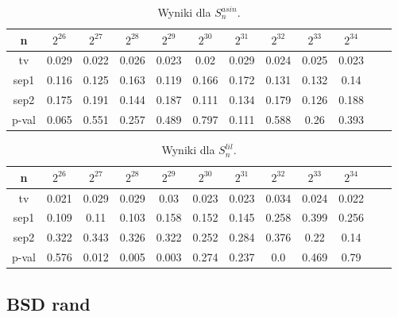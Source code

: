 \documentclass[a4paper,11pt,twoside]{book}
\newcommand{\Slil}[1]{S^{lil}_#1}
\newcommand{\Sasin}[1]{S^{asin}_#1}
\theoremstyle{definition}
\begin{document}
\begin{table}[ht!]
\centering
 \caption{Wyniki dla $\Sasin{n}$.}
 \label{tab:mojkomp_asin}
\begin{tabular} {||c|c|c|c|c|c|c|c|c|c|c|c||}  
 \hline
     n &  $2^{26}$ &  $2^{27}$ &  $2^{28}$ &  $2^{29}$ &  $2^{30}$ &  $2^{31}$ &  $2^{32}$ &  $2^{33}$ &  $2^{34}$\\ \hline
    tv &  0.029 &  0.022 &  0.026 &  0.023 &   0.02 &  0.029 &  0.024 &  0.025 &  0.023\\ \hline
  sep1 &  0.116 &  0.125 &  0.163 &  0.119 &  0.166 &  0.172 &  0.131 &  0.132 &   0.14\\ \hline
  sep2 &  0.175 &  0.191 &  0.144 &  0.187 &  0.111 &  0.134 &  0.179 &  0.126 &  0.188\\ \hline
 p-val &  0.065 &  0.551 &  0.257 &  0.489 &  0.797 &  0.111 &  0.588 &   0.26 &  0.393\\ \hline


 
\end{tabular}  
\end{table}
\begin{table}[ht!]
\centering
 \caption{Wyniki dla $\Slil{n}$.}
 \label{tab:mojkomp_lil}
\begin{tabular} {||c|c|c|c|c|c|c|c|c|c|c|c||}  
 \hline 
     n &  $2^{26}$ &  $2^{27}$ &  $2^{28}$ &  $2^{29}$ &  $2^{30}$ &  $2^{31}$ &  $2^{32}$ &  $2^{33}$ &  $2^{34}$\\ \hline
    tv &  0.021 &  0.029 &  0.029 &   0.03 &  0.023 &  0.023 &  0.034 &  0.024 &  0.022\\ \hline
  sep1 &  0.109 &   0.11 &  0.103 &  0.158 &  0.152 &  0.145 &  0.258 &  0.399 &  0.256\\ \hline
  sep2 &  0.322 &  0.343 &  0.326 &  0.322 &  0.252 &  0.284 &  0.376 &   0.22 &   0.14\\ \hline
 p-val &  0.576 &  0.012 &  0.005 &  0.003 &  0.274 &  0.237 &    0.0 &  0.469 &   0.79\\ \hline

 
\end{tabular}  
\end{table}

\FloatBarrier
\subsection{BSD rand}
\end{document}
